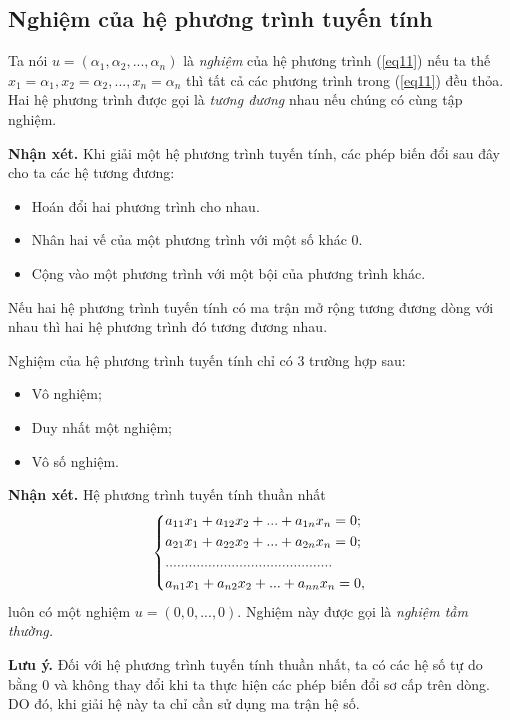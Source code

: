 \subsection{Nghiệm của hệ phương trình tuyến tính}
Ta nói $u = \left( {\alpha_1}, {\alpha_2}, ..., {\alpha_n} \right)$ là \textit{nghiệm} của hệ phương trình (\ref{eq11}) nếu ta thế $x_1 = \alpha_1, x_2 = \alpha_2, ..., x_n = \alpha_n$ thì tất cả các phương trình trong (\ref{eq11}) đều thỏa.\\
Hai hệ phương trình được gọi là \textit{tương đương} nhau nếu chúng có cùng tập nghiệm.
\begin{mybox}
\textbf{Nhận xét.} Khi giải một hệ phương trình tuyến tính, các phép biến đổi sau đây cho ta các hệ tương đương:
\begin{itemize}
\item Hoán đổi hai phương trình cho nhau.
\item Nhân hai vế của một phương trình với một số khác $0.$
\item Cộng vào một phương trình với một bội của phương trình khác.
\end{itemize}
\end{mybox}
\begin{mybox}
\begin{theorem}
Nếu hai hệ phương trình tuyến tính có ma trận mở rộng tương đương dòng với nhau thì hai hệ phương trình đó tương đương nhau.
\end{theorem}
\end{mybox}
\begin{mybox}
Nghiệm của hệ phương trình tuyến tính chỉ có 3 trường hợp sau:
\begin{itemize}
\item Vô nghiệm;
\item Duy nhất một nghiệm;
\item Vô số nghiệm.
\end{itemize}
\end{mybox}
\begin{mybox}
\textbf{Nhận xét.} Hệ phương trình tuyến tính thuần nhất
$$\left\{ \begin{gathered}
  {a_{11}}{x_1} + {a_{12}}{x_2} + ... + {a_{1n}}{x_n} = 0; \hfill \\
  {a_{21}}{x_1} + {a_{22}}{x_2} + ... + {a_{2n}}{x_n} = 0; \hfill \\
  ........................................... \hfill \\
  {a_{n1}}{x_1} + {a_{n2}}{x_2} + ... + {a_{nn}}{x_n} = 0, \hfill \\ 
\end{gathered}  \right.$$
luôn có một nghiệm $u = \left( {0, 0, ..., 0} \right).$ Nghiệm này được gọi là \textit{nghiệm tầm thường.}
\end{mybox}
\textbf{Lưu ý.} Đối với hệ phương trình tuyến tính thuần nhất, ta có các hệ số tự do bằng $0$ và không thay đổi khi ta thực hiện các phép biến đổi sơ cấp trên dòng. DO đó, khi giải hệ này ta chỉ cần sử dụng ma trận hệ số.
